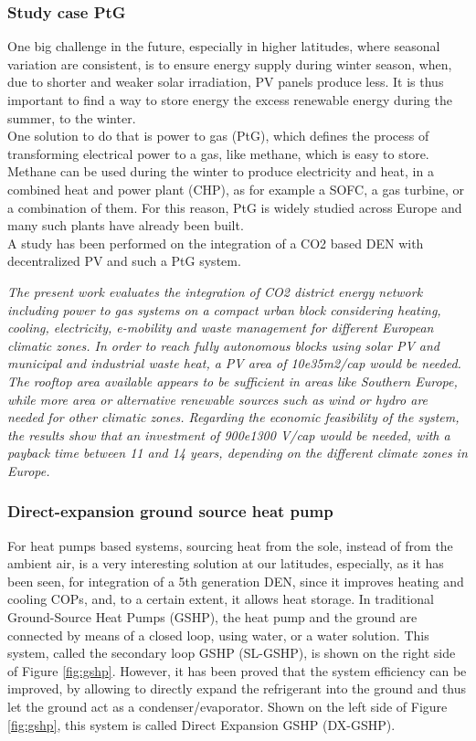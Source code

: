 \documentclass{article}
\begin{document}
\subsubsection{Study case PtG}
One big challenge in the future, especially in higher latitudes, where seasonal variation are consistent, is to ensure energy supply during winter season, when, due to shorter and weaker solar irradiation, PV panels produce less. It is thus important to find a way to store energy the excess renewable energy during the summer, to the winter.\\
One solution to do that is power to gas (PtG), which defines the process of transforming electrical power to a gas, like methane, which is easy to store. Methane can be used during the winter to produce electricity and heat, in a combined heat and power plant (CHP), as for example a SOFC, a gas turbine, or a combination of them. For this reason, PtG is widely studied across Europe and many such plants have already been built.\\ 
A study \cite{suciuEnergyIntegrationCO22018} has been performed on the integration of a CO2 based DEN with decentralized PV and such a PtG system.

\textit{The present work evaluates the integration of CO2 district energy network including power to gas systems on a compact urban block considering heating, cooling, electricity, e-mobility and waste management for different European climatic zones. In order to reach fully autonomous blocks using solar PV and municipal and industrial waste heat, a PV area of 10e35m2/cap would be needed. The rooftop area available appears to be sufficient in areas like Southern Europe, while more area or alternative renewable sources such as wind or hydro are needed for other climatic zones. Regarding the economic feasibility of the system, the results show that an investment of 900e1300 V/cap would be needed, with a payback time between 11 and 14 years, depending on the different climate zones in Europe.}\cite{suciuEnergyIntegrationCO22018}

\subsubsection{Direct-expansion ground source heat pump}\label{ss:dx}
For heat pumps based systems, sourcing heat from the sole, instead of from the ambient air, is a very interesting solution at our latitudes, especially, as it has been seen, for integration of a 5th generation DEN, since it improves heating and cooling COPs, and, to a certain extent, it allows heat storage. In traditional Ground-Source Heat Pumps (GSHP), the heat pump and the ground are connected by means of a closed loop, using water, or a water solution. This system, called the secondary loop GSHP (SL-GSHP), is shown on the right side of Figure \ref{fig:gshp}. However, it has been proved \cite{kruseStatusDevelopmentResearch}\cite{guoTechnoeconomicComparisonDirect2012} that the system efficiency can be improved, by allowing to directly expand the refrigerant into the ground and thus let the ground act as a condenser/evaporator. Shown on the left side of Figure \ref{fig:gshp}, this system is called Direct Expansion GSHP (DX-GSHP). 
\end{document}
